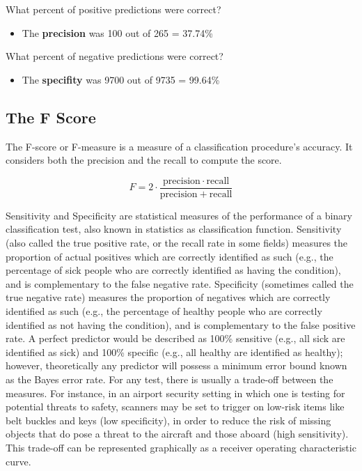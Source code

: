 \documentclass[]{report}
\begin{document}
What percent of positive predictions were correct?

\begin{itemize}
\item The \textbf{precision} was 100 out of 265 = 37.74\%
\end{itemize}

What percent of negative predictions were correct?

\begin{itemize}
\item The \textbf{specifity} was 9700 out of 9735 = 99.64\%
\end{itemize}

\subsection{The F Score}

The F-score or F-measure is a measure of a classification procedure's accuracy.
It considers both the precision  and the recall to compute the score.

\[ F = 2 \cdot \frac{\mathrm{precision} \cdot \mathrm{recall}}{\mathrm{precision} + \mathrm{recall}}\]

\newpage


Sensitivity and Specificity are statistical measures of the performance of a binary classification test, also known in statistics as classification function. Sensitivity (also called the true positive rate, or the recall rate in some fields) measures the proportion of actual positives which are correctly identified as such (e.g., the percentage of sick people who are correctly identified as having the condition), and is complementary to the false negative rate. Specificity (sometimes called the true negative rate) measures the proportion of negatives which are correctly identified as such (e.g., the percentage of healthy people who are correctly identified as not having the condition), and is complementary to the false positive rate.
A perfect predictor would be described as 100\% sensitive (e.g., all sick are identified as sick) and 100\% specific (e.g., all healthy are identified as healthy); however, theoretically any predictor will possess a minimum error bound known as the Bayes error rate.
For any test, there is usually a trade-off between the measures. For instance, in an airport security setting in which one is testing for potential threats to safety, scanners may be set to trigger on low-risk items like belt buckles and keys (low specificity), in order to reduce the risk of missing objects that do pose a threat to the aircraft and those aboard (high sensitivity). This trade-off can be represented graphically as a receiver operating characteristic curve.
\end{document}
